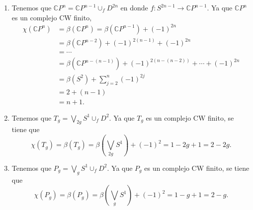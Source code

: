 \documentclass[11pt,a4paper]{article}
\theoremstyle{plain}
\theoremstyle{definition}
\theoremstyle{remark}
\newcommand{\RR}{\mathbb R}
\newcommand{\CC}{\mathbb C}
\begin{document}
\begin{enumerate}[label=\arabic*.,leftmargin=*]
\begin{enumerate}[label=\alph*)]
$f:S^{n-1}\to\RR P^{n-1}$. Ya que $\RR P^n$ es complejo CW finito,
\[
\begin{aligned}
\chi(\RR P^n)&=\beta(\RR P^n)=\beta(\RR P^{n-1})+(-1)^n\\
&=\beta(\RR P^{n-2})+(-1)^{n-1}+(-1)^n\\
&=\beta(\RR P^{n-3})+(-1)^{n-2}+(-1)^{n-1}+(-1)^n\\
&=\cdots\\
&=\beta(\RR P^{n-(n-1)})+(-1)^{n-(n-2)}+\cdots+(-1)^{n-1}+(-1)^n\\
&=\beta(S^1)+\sum_{j=2}^n(-1)^j\\
&=\sum_{j=2}^n(-1)^j\\
&=1+\sum_{j=3}^{n-1}(-1)^j+(-1)^n.
\end{aligned}
\]
Obsérvese que si $n$ es par, entonces $n-1$ es impar. Por lo tanto, la suma
en la ecuación anterior contiene $n-3$ términos. Esto es, un número impar
de términos cuyo primer término es $-1$. Así, cuando $n$ es par,
$\chi(\RR P^n)=1-1+(-1)^n=1$.

Por otra parte, si $n$ es impar, entonces $n-1$ es par. De este modo, la
suma en la ecuación anterior contiene un número par de términos. Por lo
tanto, la suma es cero. Cuando $n$ es impar,
$\chi(\RR P^n)=1+0+(-1)^n=0$. En resumen,
\[
\chi(\RR P^n)=\begin{cases}1 & n\text{ par}\\0 & \text{e.o.c.}\end{cases}
\]
\item Tenemos que $\CC P^n=\CC P^{n-1}\cup_fD^{2n}$ en donde
$f:S^{2n-1}\to\CC P^{n-1}$. Ya que $\CC P^n$ es un complejo CW finito,
\[
\begin{aligned}
\chi(\CC P^n)&=\beta(\CC P^n)=\beta(\CC P^{n-1})+(-1)^{2n}\\
&=\beta(\CC P^{n-2})+(-1)^{2(n-1)}+(-1)^{2n}\\
&=\cdots\\
&=\beta(\CC P^{n-(n-1)})+(-1)^{2(n-(n-2))}+\cdots+(-1)^{2n}\\
&=\beta(S^2)+\sum_{j=2}^n(-1)^{2j}\\
&=2+(n-1)\\
&=n+1.
\end{aligned}
\]
\item Tenemos que $T_g=\bigvee_{2g}S^1\cup_fD^2$. Ya que $T_g$ es un
complejo CW finito, se tiene que
\[
\chi(T_g)=\beta(T_g)=\beta\left(\bigvee_{2g}S^1\right)+(-1)^2=1-2g+1=2-2g.
\]
\item Tenemos que $P_g=\bigvee_gS^1\cup_fD^2$. Ya que $P_g$ es un complejo
CW finito, se tiene que
\[
\chi(P_g)=\beta(P_g)=\beta\left(\bigvee_gS^1\right)+(-1)^2=1-g+1=2-g.
\]
\end{enumerate}


\end{enumerate}
\end{document}
